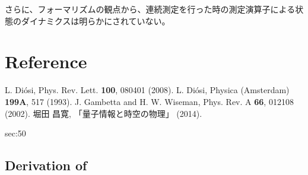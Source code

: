 \documentclass[10pt, a4paper]{jsarticle}
\begin{document}
さらに、フォーマリズムの観点から、連続測定を行った時の測定演算子による状態のダイナミクスは明らかにされていない。

\section{Reference}
\label{sec:40}

\begingroup
\renewcommand{\section}[2]{}
\begin{thebibliography}{0}
\setlength{\parskip}{0mm}
\setlength{\itemsep}{-0.3mm}
\small
	L. Di\'{o}si, Phys. Rev. Lett. \textbf{100}, 080401 (2008).
	L. Di\'{o}si, Physica (Amsterdam) \textbf{199A}, 517 (1993).
	J. Gambetta and H. W. Wiseman, Phys. Rev. A \textbf{66}, 012108 (2002).
	堀田 昌寛, 「量子情報と時空の物理」 (2014).
\end{thebibliography}
\endgroup


\section{Appendix}
\label{sec:50}

\subsection{Derivation of }
\label{sec:51}
\end{document}
